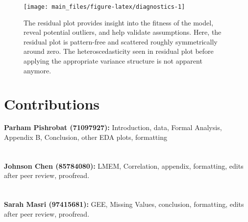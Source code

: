 \documentclass[
]{article}
\begin{document}
\begin{figure}

{\centering \texttt{[image: main\_files/figure-latex/diagnostics-1]} 

}

\caption{The residual plot provides insight into the fitness of the model, reveal potential outliers, and help validate assumptions. Here, the residual plot is pattern-free and scattered roughly symmetrically around zero. The heteroscedasticity seen in residual plot before applying the appropriate variance structure is not apparent anymore.}\label{fig:diagnostics}
\end{figure}

\pagebreak

\hypertarget{contributions}{%
\section{Contributions}\label{contributions}}

\textbf{Parham Pishrobat (71097927):} Introduction, data, Formal Analysis, Appendix B, Conclusion, other EDA plots, formatting\\ \\ \\
\textbf{Johnson Chen (85784080):}  \quad LMEM, Correlation, appendix, formatting, edits after peer review, proofread.\\ \\ \\
\textbf{Sarah Masri (97415681):} \quad GEE, Missing Values, conclusion, formatting, edits after peer review, proofread.\\ \\ \\
\end{document}
